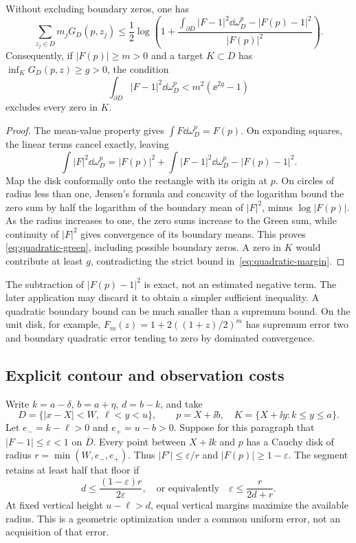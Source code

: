 \begin{lemma}\label{lem:quadratic-green}
Without excluding boundary zeros, one has
\begin{equation}\label{eq:quadratic-green}
 \sum_{z_j\in D}m_jG_D(p,z_j)
 \le\frac12\log\left(1+
 \frac{\displaystyle\int_{\partial D}|F-1|^2\dd\omega_D^p
                         -|F(p)-1|^2}{|F(p)|^2}\right).
\end{equation}
Consequently, if $|F(p)|\ge m>0$ and a target $K\subset D$ has
$\inf_KG_D(p,z)\ge g>0$, the condition
\begin{equation}\label{eq:quadratic-margin}
 \int_{\partial D}|F-1|^2\dd\omega_D^p<m^2(\ee^{2g}-1)
\end{equation}
excludes every zero in $K$.
\end{lemma}
\begin{proof}
The mean-value property gives $\int F\dd\omega_D^p=F(p)$.
On expanding squares, the linear terms cancel exactly, leaving
\[
 \int|F|^2\dd\omega_D^p
 =|F(p)|^2+\int|F-1|^2\dd\omega_D^p-|F(p)-1|^2.
\]
Map the disk conformally onto the rectangle with its origin at $p$.
On circles of radius less than one, Jensen's formula and concavity of
the logarithm bound the zero sum by half the logarithm of the boundary
mean of $|F|^2$, minus $\log|F(p)|$. As the radius increases to one,
the zero sums increase to the Green sum, while continuity of $|F|^2$
gives convergence of its boundary means. This proves
\eqref{eq:quadratic-green}, including possible boundary zeros.
A zero in $K$ would contribute at least $g$, contradicting the strict
bound in~\eqref{eq:quadratic-margin}.
\end{proof}

The subtraction of $|F(p)-1|^2$ is exact, not an estimated negative
term. The later application may discard it to obtain a simpler
sufficient inequality. A quadratic boundary bound can be much smaller
than a supremum bound. On the unit disk, for example,
$F_m(z)=1+2((1+z)/2)^m$ has supremum error two and boundary quadratic
error tending to zero by dominated convergence.

\subsection{Explicit contour and observation costs}

Write $k=a-\delta$, $b=a+\eta$, $d=b-k$, and take
\[
 D=\{|x-X|<W,\ \ell<y<u\},\qquad
 p=X+\ii b,\quad K=\{X+\ii y:k\le y\le a\}.
\]
Let $e_-=k-\ell>0$ and $e_+=u-b>0$.
Suppose for this paragraph that $|F-1|\le\varepsilon<1$ on
$\overline D$. Every point between $X+\ii k$ and $p$ has a Cauchy
disk of radius $r=\min(W,e_-,e_+)$. Thus
$|F'|\le\varepsilon/r$ and $|F(p)|\ge1-\varepsilon$.
The segment retains at least half that floor if
\begin{equation}\label{eq:cauchy-cost}
 d\le\frac{(1-\varepsilon)r}{2\varepsilon},
 \quad\text{or equivalently}\quad
 \varepsilon\le\frac{r}{2d+r}.
\end{equation}
At fixed vertical height $u-\ell>d$, equal vertical margins maximize
the available radius. This is a geometric optimization under a common
uniform error, not an acquisition of that error.

